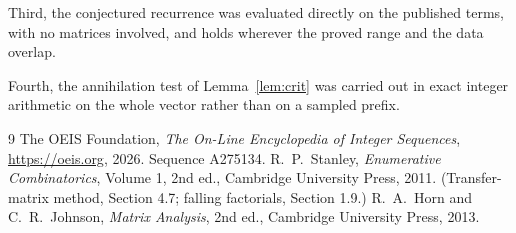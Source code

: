 \documentclass[11pt,a4paper]{article}
\theoremstyle{plain}
\theoremstyle{definition}
\begin{document}
Third, the conjectured recurrence was evaluated directly on the published terms, with no
matrices involved, and holds wherever the proved range and the data overlap.

Fourth, the annihilation test of Lemma~\ref{lem:crit} was carried out in exact integer
arithmetic on the whole vector rather than on a sampled prefix.

\begin{thebibliography}{9}
 The OEIS Foundation, \emph{The On-Line Encyclopedia of Integer
Sequences}, \url{https://oeis.org}, 2026. Sequence A275134.
 R.~P.~Stanley, \emph{Enumerative Combinatorics}, Volume 1, 2nd ed.,
Cambridge University Press, 2011. (Transfer-matrix method, Section 4.7; falling factorials,
Section 1.9.)
 R.~A.~Horn and C.~R.~Johnson, \emph{Matrix Analysis}, 2nd ed., Cambridge
University Press, 2013.
\end{thebibliography}
\end{document}
